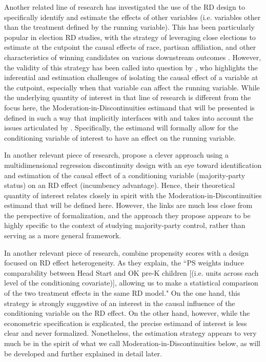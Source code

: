 \documentclass[12pt]{article}
\begin{document}
Another related line of research has investigated the use of the RD design to specifically identify and estimate the effects of other variables (i.e. variables other than the treatment defined by the running variable). This has been particularly popular in election RD studies, with the strategy of leveraging close elections to estimate at the cutpoint the causal effects of race, partisan affiliation, and other characteristics of winning candidates on various downstream outcomes \cite[for an overview, see][]{marshall2019}. However, the validity of this strategy has been called into question by \citet{marshall2019}, who highlights the inferential and estimation challenges of isolating the causal effect of a variable at the cutpoint, especially when that variable can affect the running variable. While the underlying quantity of interest in that line of research is different from the focus here, the Moderation-in-Discontinuities estimand that will be presented is defined in such a way that implicitly interfaces with and takes into account the issues articulated by \cite{marshall2019}. Specifically, the estimand will formally allow for the conditioning variable of interest to have an effect on the running variable.


In another relevant piece of research, \cite{feigenbaum2017majority} propose a clever approach using a multidimensional regression discontinuity design with an eye toward identification and estimation of the causal effect of a conditioning variable (majority-party status) on an RD effect (incumbency advantage). Hence, their theoretical quantity of interest relates closely in spirit with the Moderation-in-Discontinuities estimand that will be defined here. However, the links are much less close from the perspective of formalization, and the approach they propose appears to be highly specific to the context of studying majority-party control, rather than serving as a more general framework.

In another relevant piece of research, \cite{jenkins2016head} combine propensity scores with a design focused on RD effect heterogeneity. As they explain, the ``PS weights induce comparability between Head Start and OK pre-K children [(i.e. units across each level of the conditioning covariate)], allowing us to make a statistical comparison of the two treatment effects in the same RD model." On the one hand, this strategy is strongly suggestive of an interest in the causal influence of the conditioning variable on the RD effect. On the other hand, however, while the econometric specification is explicated, the precise estimand of interest is less clear and never formalized. Nonetheless, the estimation strategy appears to very much be in the spirit of what we call Moderation-in-Discontinuities below, as will be developed and further explained in detail later.
\end{document}
